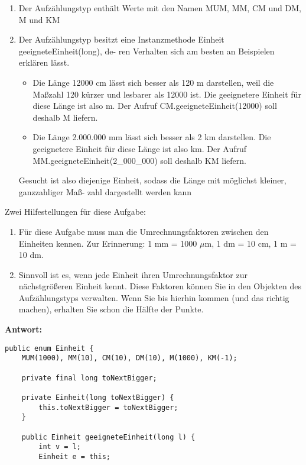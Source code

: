 {\begin{enumerate}
    \item Der Aufzählungstyp enthält Werte mit den Namen MUM, MM, CM und DM, M und KM
    \item Der Aufzählungstyp besitzt eine Instanzmethode Einheit geeigneteEinheit(long),
          de- ren Verhalten sich am besten an Beispielen erklären lässt.
          \begin{itemize}
              \item Die Länge 12000 cm lässt sich besser als 120 m darstellen, weil die Maßzahl 120
                    kürzer und lesbarer als 12000 ist. Die geeignetere Einheit für diese Länge ist
                    also m. Der Aufruf CM.geeigneteEinheit(12000) soll deshalb M liefern.
              \item Die Länge 2.000.000 mm lässt sich besser als 2 km darstellen. Die geeignetere
                    Einheit für diese Länge ist also km. Der Aufruf
                    MM.geeigneteEinheit(2\_000\_000) soll deshalb KM liefern.
          \end{itemize}
          Gesucht ist also diejenige Einheit, sodass die Länge mit möglichst kleiner, ganzzahliger Maß-
          zahl dargestellt werden kann
\end{enumerate}

Zwei Hilfestellungen für diese Aufgabe:

\begin{enumerate}
    \item Für diese Aufgabe muss man die Umrechnungsfaktoren zwischen den Einheiten
          kennen. Zur Erinnerung: 1 mm = 1000 $\mu$m, 1 dm = 10 cm, 1 m = 10 dm.
    \item Sinnvoll ist es, wenn jede Einheit ihren Umrechnungsfaktor zur nächstgrößeren
          Einheit kennt. Diese Faktoren können Sie in den Objekten des Aufzählungstyps
          verwalten. Wenn Sie bis hierhin kommen (und das richtig machen), erhalten Sie
          schon die Hälfte der Punkte.
\end{enumerate}

\textbf{Antwort:}

\begin{lstlisting}
public enum Einheit {
    MUM(1000), MM(10), CM(10), DM(10), M(1000), KM(-1);

    private final long toNextBigger;

    private Einheit(long toNextBigger) {
        this.toNextBigger = toNextBigger;
    }

    public Einheit geeigneteEinheit(long l) {
        int v = l;
        Einheit e = this;


\end{lstlisting}}
